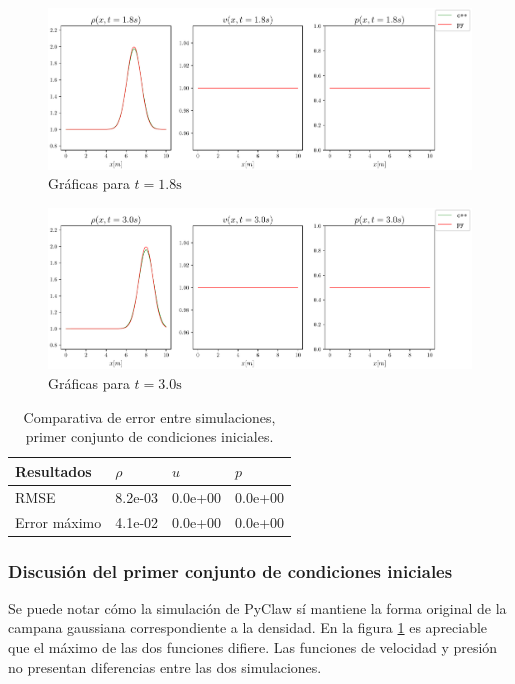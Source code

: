 \begin{figure}[H]
	\centering
	\includegraphics[width=1.1\linewidth]{../euler1D/plots_en_TDG/py_sin_claw/py_gauss199/4.pdf}
	\caption{Gráficas para $t=1.8\unit{\s}$}
\end{figure}

\begin{figure}[H]
\centering
\includegraphics[width=1.1\linewidth]{../euler1D/plots_en_TDG/py_sin_claw/py_gauss199/6.pdf}
\caption{Gráficas para $t=3.0\unit{\s}$}
\label{fig:set-1-py-seg3}
\end{figure}

\begin{table}[ht]
	\large
	\centering
	\begin{tabular}{|l|l|l|l|}
		\hline
		Resultados & $\rho$ & $u$ & $p$ \\ \hline
		RMSE & 8.2e-03 & 0.0e+00 & 0.0e+00 \\ \hline
		Error máximo & 4.1e-02 & 0.0e+00 & 0.0e+00 \\ \hline
	\end{tabular}
	\caption{Comparativa de error entre simulaciones, primer conjunto de condiciones iniciales.}
	\label{tab:tabla-set-1}
\end{table}

\subsubsection{Discusión del primer conjunto de condiciones iniciales}
Se puede notar cómo la simulación de PyClaw sí mantiene la forma original de la campana gaussiana correspondiente a la densidad. En la figura \ref{fig:set-1-py-seg3} es apreciable que el máximo de las dos funciones difiere. Las funciones de velocidad y presión no presentan diferencias entre las dos simulaciones.



